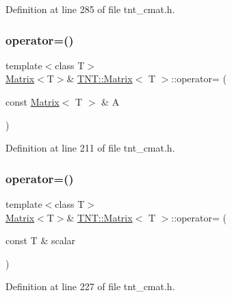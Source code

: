 Definition at line 285 of file tnt\+\_\+cmat.\+h.

\mbox{\label{classTNT_1_1Matrix_aa038201ce3cfc209613055d82052299a}} 
\subsubsection{\texorpdfstring{operator=()}{operator=()}\hspace{0.1cm}{\footnotesize\ttfamily [1/2]}}
{\footnotesize\ttfamily template$<$class T$>$ \\
\hyperlink{classTNT_1_1Matrix}{Matrix}$<$T$>$\& \hyperlink{classTNT_1_1Matrix}{T\+N\+T\+::\+Matrix}$<$ T $>$\+::operator= (\begin{DoxyParamCaption}\item[{const \hyperlink{classTNT_1_1Matrix}{Matrix}$<$ T $>$ \&}]{A }\end{DoxyParamCaption})\hspace{0.3cm}{\ttfamily [inline]}}



Definition at line 211 of file tnt\+\_\+cmat.\+h.

\mbox{\label{classTNT_1_1Matrix_af09aba37e69f4c7479952bcade58db4d}} 
\subsubsection{\texorpdfstring{operator=()}{operator=()}\hspace{0.1cm}{\footnotesize\ttfamily [2/2]}}
{\footnotesize\ttfamily template$<$class T$>$ \\
\hyperlink{classTNT_1_1Matrix}{Matrix}$<$T$>$\& \hyperlink{classTNT_1_1Matrix}{T\+N\+T\+::\+Matrix}$<$ T $>$\+::operator= (\begin{DoxyParamCaption}\item[{const T \&}]{scalar }\end{DoxyParamCaption})\hspace{0.3cm}{\ttfamily [inline]}}



Definition at line 227 of file tnt\+\_\+cmat.\+h.

